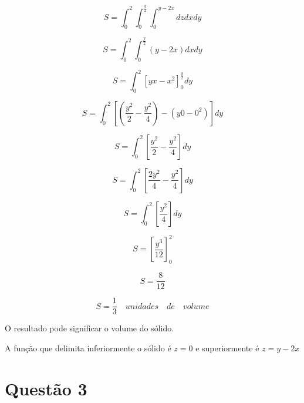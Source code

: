 \documentclass[10pt,a4paper]{article}
\begin{document}
	\begin{equation*}
		S = \int_{0}^{2} \int_{0}^{\frac{y}{2}} \int_{0}^{y-2x} dz dx dy
	\end{equation*}
	
	\begin{equation*}
		S = \int_{0}^{2} \int_{0}^{\frac{y}{2}} \left(y-2x \right) dx dy
	\end{equation*}
	
	\begin{equation*}
		S = \int_{0}^{2} \left[ yx-x^2 \right]_0^{\frac{y}{2}} dy
	\end{equation*}

	\begin{equation*}
		S = \int_{0}^{2} \left[ \left(\frac{y^2}{2}-\frac{y^2}{4}\right) - \left(y0-0^2\right) \right] dy
	\end{equation*}	
	
	\begin{equation*}
		S = \int_{0}^{2} \left[\frac{y^2}{2}-\frac{y^2}{4} \right] dy
	\end{equation*}	
	
	\begin{equation*}
		S = \int_{0}^{2} \left[\frac{2y^2}{4}-\frac{y^2}{4} \right] dy
	\end{equation*}
	
	\begin{equation*}
		S = \int_{0}^{2} \left[\frac{y^2}{4}\right] dy
	\end{equation*}	
	
	\begin{equation*}
		S = \left[\frac{y^3}{12} \right]_0^2
	\end{equation*}
	
	\begin{equation*}
		S = \frac{8}{12}
	\end{equation*}
	
	\begin{equation*}
		S = \frac{1}{3} \quad unidades \quad de \quad volume
	\end{equation*}
	
	O resultado pode significar o volume do sólido.
	
	A função que delimita inferiormente o sólido é $ z = 0 $ e superiormente é $ z = y - 2x $
	
	\section*{Questão 3}
	
\end{document}
